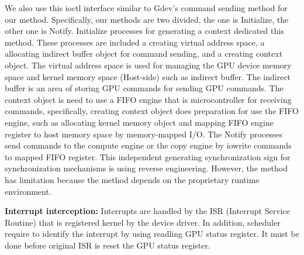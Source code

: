 We also use this ioctl interface similar to Gdev's command sending method for our method.
Specifically, our methods are two divided, the one is Initialize, the other one is Notify.
Initialize processes for generating a context dedicated this method.
These processes are included a creating virtual address space, a allocating indirect buffer object for command sending, and a creating context object.
The virtual address space is used for managing the GPU device memory space and kernel memory space (Host-side) such as indirect buffer.
The indirect buffer is an area of storing GPU commands for sending GPU commands.
The context object is need to use a FIFO engine that is microcontroller for receiving commands, 
specifically, creating context object does preparation for use the FIFO engine, such as allocating kernel memory object and mapping FIFO engine register to host memory space by memory-mapped I/O.
The Notify processes send commands to the compute engine or the copy engine by iowrite commands to mapped FIFO register.
This independent generating synchronization sign for synchronization mechanisms is using reverse engineering.
However, the method has limitation because the method depends on the proprietary runtime environment.


\textbf{Interrupt interception:}
Interrupts are handled by the ISR (Interrupt Service Routine) that is registered kernel by the device driver.
In addition, scheduler require to identify the interrupt by using readling GPU status register.
It must be done before original ISR is reset the GPU status register.


